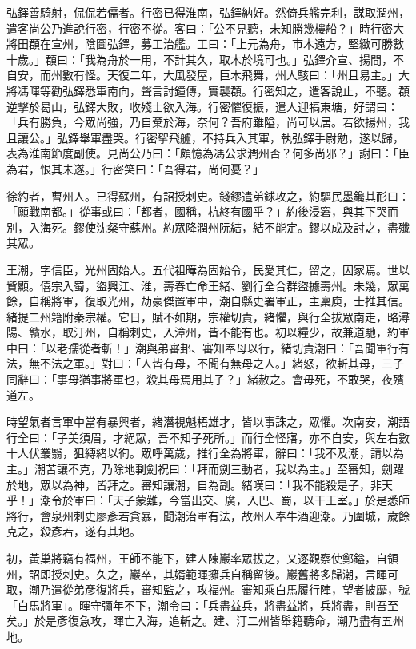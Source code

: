 \begin{pinyinscope}
 弘鐸善騎射，侃侃若儒者。行密已得淮南，弘鐸納好。然倚兵艦完利，謀取潤州，遣客尚公乃進說行密，行密不從。客曰：「公不見聽，未知勝幾樓船？」時行密大將田頵在宣州，陰圖弘鐸，募工治艦。工曰：「上元為舟，市木遠方，堅緻可勝數十歲。」頵曰：「我為舟於一用，不計其久，取木於境可也。」弘鐸介宣、揚間，不自安，而州數有怪。天復二年，大風發屋，巨木飛舞，州人駭曰：「州且易主。」大將馮暉等勸弘鐸悉軍南向，聲言討鐘傳，實襲頵。行密知之，遣客說止，不聽。頵逆擊於曷山，弘鐸大敗，收殘士欲入海。行密懼復振，遣人迎犒東塘，好謂曰：「兵有勝負，今眾尚強，乃自棄於海，奈何？吾府雖隘，尚可以居。若欲揚州，我且讓公。」弘鐸舉軍盡哭。行密挐飛艫，不持兵入其軍，執弘鐸手尉勉，遂以歸，表為淮南節度副使。見尚公乃曰：「頗憶為馮公求潤州否？何多尚邪？」謝曰：「臣為君，恨其未遂。」行密笑曰：「吾得君，尚何憂？」



 徐約者，曹州人。已得蘇州，有詔授刺史。錢鏐遣弟銶攻之，約驅民墨鑱其耏曰：「願戰南都。」從事或曰：「都者，國稱，杭終有國乎？」約後浸窘，與其下哭而別，入海死。鏐使沈粲守蘇州。約眾降潤州阮結，結不能定。鏐以成及討之，盡殲其眾。



 王潮，字信臣，光州固始人。五代祖曄為固始令，民愛其仁，留之，因家焉。世以貲顯。僖宗入蜀，盜興江、淮，壽春亡命王緒、劉行全合群盜據壽州。未幾，眾萬餘，自稱將軍，復取光州，劫豪傑置軍中，潮自縣史署軍正，主稟庾，士推其信。緒提二州籍附秦宗權。它日，賦不如期，宗權切責，緒懼，與行全拔眾南走，略潯陽、贛水，取汀州，自稱刺史，入漳州，皆不能有也。初以糧少，故兼道馳，約軍中曰：「以老孺從者斬！」潮與弟審邽、審知奉母以行，緒切責潮曰：「吾聞軍行有法，無不法之軍。」對曰：「人皆有母，不聞有無母之人。」緒怒，欲斬其母，三子同辭曰：「事母猶事將軍也，殺其母焉用其子？」緒赦之。會毋死，不敢哭，夜殯道左。



 時望氣者言軍中當有暴興者，緒潛視魁梧雄才，皆以事誅之，眾懼。次南安，潮語行全曰：「子美須眉，才絕眾，吾不知子死所。」而行全怪寤，亦不自安，與左右數十人伏叢翳，狙縛緒以徇。眾呼萬歲，推行全為將軍，辭曰：「我不及潮，請以為主。」潮苦讓不克，乃除地剚劍祝曰：「拜而劍三動者，我以為主。」至審知，劍躍於地，眾以為神，皆拜之。審知讓潮，自為副。緒嘆曰：「我不能殺是子，非天乎！」潮令於軍曰：「天子蒙難，今當出交、廣，入巴、蜀，以干王室。」於是悉師將行，會泉州刺史廖彥若貪暴，聞潮治軍有法，故州人奉牛酒迎潮。乃圍城，歲餘克之，殺彥若，遂有其地。



 初，黃巢將竊有福州，王師不能下，建人陳巖率眾拔之，又逐觀察使鄭鎰，自領州，詔即授刺史。久之，巖卒，其婿範暉擁兵自稱留後。巖舊將多歸潮，言暉可取，潮乃遣從弟彥復將兵，審知監之，攻福州。審知乘白馬履行陣，望者披靡，號「白馬將軍」。暉守彌年不下，潮令曰：「兵盡益兵，將盡益將，兵將盡，則吾至矣。」於是彥復急攻，暉亡入海，追斬之。建、汀二州皆舉籍聽命，潮乃盡有五州地。




\end{pinyinscope}
